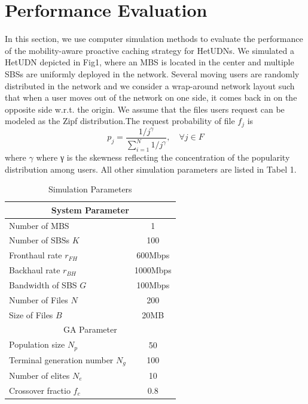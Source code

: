 \documentclass[conference]{IEEEtran}
\begin{document}
\section{Performance Evaluation}
In this section, we use computer simulation methods to evaluate the performance of the mobility-aware proactive caching strategy for HetUDNs. We simulated a HetUDN depicted in Fig1, where an MBS is located in the center and multiple SBSs are uniformly deployed in the network. Several moving users are randomly distributed in the network and we consider a wrap-around network layout such that when a user moves out of the network on one side, it comes back in on the opposite side w.r.t. the origin. We assume that the files users request can be modeled as the Zipf distribution.The request probability of file $f_j$ is
$$p_j=\frac{1/j^\gamma}{\sum_{i=1}^N 1/j^\gamma}, \quad \forall j\in F$$
where $\gamma$ where γ is the skewness reflecting the concentration of the popularity distribution among users. All other simulation parameters are listed in Tabel 1.

\begin{table}[htbp]
 \caption{Simulation Parameters}
 \begin{center}
  \begin{tabular}{|l|c|}
   \hline
   \multicolumn{2}{|c|}{System Parameter}                \\\hline
   Number of MBS                  & 1                 \\ \hline
   Number of SBSs $K$    & 100                \\\hline
   Fronthaul rate $r_{FH}$        & 600Mbps               \\ \hline
   Backhaul rate $r_{BH}$         & 1000Mbps               \\\hline
   Bandwidth of SBS $G$            &  100Mbps              \\\hline
   Number of Files $N$           & 200               \\\hline
   Size of Files $B$            & 20MB            \\\hline
   \multicolumn{2}{|c|}{GA Parameter}                \\\hline
   Population size $N_p$         & 50              \\\hline
   Terminal generation number $N_g$  & 100               \\\hline
   Number of elites $N_e$        & 10              \\\hline
   Crossover fractio $f_c$            & 0.8            \\\hline
  \end{tabular}
  \label{tab1}
 \end{center}
\end{table}
\end{document}
